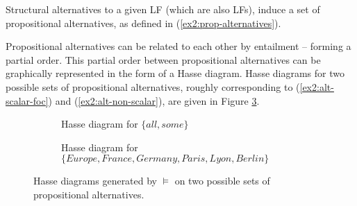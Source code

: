 Structural alternatives to a given LF (which are also LFs), induce a set of propositional alternatives, as defined in (\ref{ex2:prop-alternatives}).

\begin{exe}
	\label{ex2:prop-alternatives}
\end{exe}

Propositional alternatives can be related to each other by entailment -- forming a partial order. This partial order between propositional alternatives can be graphically represented in the form of a Hasse diagram. Hasse diagrams for two possible sets of propositional alternatives, roughly corresponding to (\ref{ex2:alt-scalar-foc}) and (\ref{ex2:alt-non-scalar}), are given in Figure \ref{fig2:hasse}.

\begin{figure}[H]
	\centering
	\begin{subfigure}[t]{.45\linewidth}
		\centering
		\caption{Hasse diagram for $\lbrace \textit{all}, \textit{some}\rbrace$}\label{fig2:hasse-scalar} 
	\end{subfigure}	
	\hfill
	\begin{subfigure}[t]{.45\linewidth}
		\centering
		\caption{Hasse diagram for $\lbrace \textit{Europe}, \textit{France}, \textit{Germany}, \textit{Paris}, \textit{Lyon}, \textit{Berlin} \rbrace$}\label{fig2:hasse-locations}
	\end{subfigure}
	\caption{Hasse diagrams generated by $\vDash$ on two possible sets of propositional alternatives.}\label{fig2:hasse}
\end{figure}

